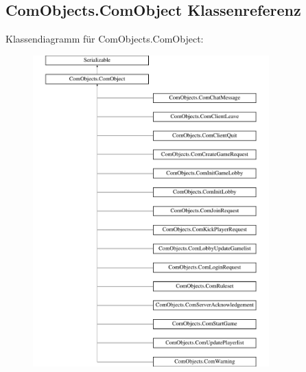 \hypertarget{a00029}{\subsection{Com\-Objects.\-Com\-Object Klassenreferenz}
\label{a00029}
}
Klassendiagramm für Com\-Objects.\-Com\-Object\-:\begin{figure}[H]
\begin{center}
\leavevmode
\includegraphics[height=12.000000cm]{a00029}
\end{center}
\end{figure}
